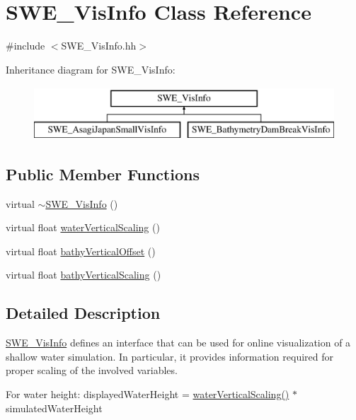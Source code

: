 \hypertarget{classSWE__VisInfo}{\section{S\-W\-E\-\_\-\-Vis\-Info Class Reference}
\label{classSWE__VisInfo}
}


{\ttfamily \#include $<$S\-W\-E\-\_\-\-Vis\-Info.\-hh$>$}

Inheritance diagram for S\-W\-E\-\_\-\-Vis\-Info\-:\begin{figure}[H]
\begin{center}
\leavevmode
\includegraphics[height=2.000000cm]{classSWE__VisInfo}
\end{center}
\end{figure}
\subsection*{Public Member Functions}
\begin{DoxyCompactItemize}
\item 
virtual \hyperlink{classSWE__VisInfo_a40c49045acf4e50dc29551d767f11e15}{$\sim$\-S\-W\-E\-\_\-\-Vis\-Info} ()
\item 
virtual float \hyperlink{classSWE__VisInfo_a9552a55a7581b7835d415315e2c17f04}{water\-Vertical\-Scaling} ()
\item 
virtual float \hyperlink{classSWE__VisInfo_a9c24e444c209f6f0c03a96950931e677}{bathy\-Vertical\-Offset} ()
\item 
virtual float \hyperlink{classSWE__VisInfo_a10ddd7a192e67c69832e695e48b26e91}{bathy\-Vertical\-Scaling} ()
\end{DoxyCompactItemize}


\subsection{Detailed Description}
\hyperlink{classSWE__VisInfo}{S\-W\-E\-\_\-\-Vis\-Info} defines an interface that can be used for online visualization of a shallow water simulation. In particular, it provides information required for proper scaling of the involved variables.

For water height\-: displayed\-Water\-Height = \hyperlink{classSWE__VisInfo_a9552a55a7581b7835d415315e2c17f04}{water\-Vertical\-Scaling()} $\ast$ simulated\-Water\-Height

